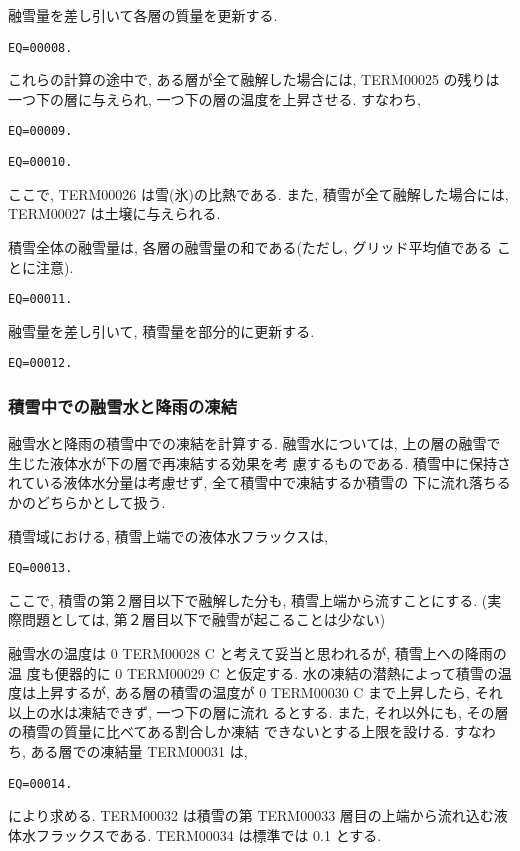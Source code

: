 融雪量を差し引いて各層の質量を更新する.
\begin{verbatim}
EQ=00008.
\end{verbatim}

これらの計算の途中で, ある層が全て融解した場合には,
TERM00025 の残りは一つ下の層に与えられ,
一つ下の層の温度を上昇させる. すなわち,
\begin{verbatim}
EQ=00009.
\end{verbatim}
\begin{verbatim}
EQ=00010.
\end{verbatim}
ここで, TERM00026 は雪(氷)の比熱である.
また, 積雪が全て融解した場合には,
 TERM00027 は土壌に与えられる.

積雪全体の融雪量は, 各層の融雪量の和である(ただし, グリッド平均値である
ことに注意).
\begin{verbatim}
EQ=00011.
\end{verbatim}
融雪量を差し引いて, 積雪量を部分的に更新する.
\begin{verbatim}
EQ=00012.
\end{verbatim}

\subsubsection{積雪中での融雪水と降雨の凍結}

融雪水と降雨の積雪中での凍結を計算する.
融雪水については, 上の層の融雪で生じた液体水が下の層で再凍結する効果を考
慮するものである.
積雪中に保持されている液体水分量は考慮せず, 全て積雪中で凍結するか積雪の
下に流れ落ちるかのどちらかとして扱う.

積雪域における, 積雪上端での液体水フラックスは,
\begin{verbatim}
EQ=00013.
\end{verbatim}
ここで, 積雪の第２層目以下で融解した分も, 積雪上端から流すことにする.
(実際問題としては, 第２層目以下で融雪が起こることは少ない)

融雪水の温度は 0 TERM00028 C と考えて妥当と思われるが, 積雪上への降雨の温
度も便器的に 0 TERM00029 C と仮定する.
水の凍結の潜熱によって積雪の温度は上昇するが, ある層の積雪の温度が
0 TERM00030 C まで上昇したら, それ以上の水は凍結できず, 一つ下の層に流れ
るとする. また, それ以外にも, その層の積雪の質量に比べてある割合しか凍結
できないとする上限を設ける. すなわち, ある層での凍結量 TERM00031 は,
\begin{verbatim}
EQ=00014.
\end{verbatim}
により求める.
TERM00032 は積雪の第 TERM00033 層目の上端から流れ込む液体水フラックスである.
TERM00034 は標準では 0.1 とする.

